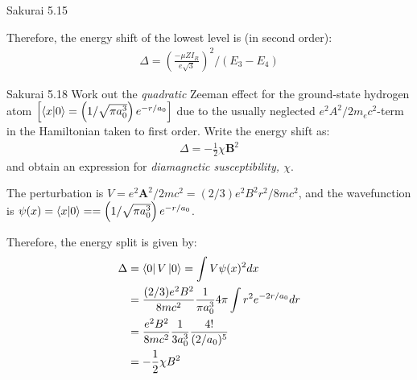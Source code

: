 \documentclass{article}
\newcommand{\bs}{\boldsymbol}
\begin{document}
\begin{section}{Sakurai 5.15}
\begin{tcolorbox}[breakable]
			Therefore, the energy shift of the lowest level is (in second order):
			\begin{align*}
				\Delta = \left( \frac{-\mu Z I_R}{e\sqrt{3}} \right)^2 / (E_3 - E_4)
			\end{align*}
		 	
		\end{tcolorbox}
	\end{section}

	\newpage
	\begin{section}{Sakurai 5.18}
		Work out the {\it quadratic} Zeeman effect for the ground-state hydrogen atom $\left[\bra{x}\ket{0} = \left( 1/\sqrt{\pi a_0^3}\right) e^{-r/a_0} \right]$ due to the usually neglected $e^2 A^2/2m_ec^2$-term in the Hamiltonian taken to first order. Write the energy shift as:
		\begin{align*}
			\Delta = -\frac{1}{2}\chi\bs{B}^2
		\end{align*}
		and obtain an expression for {\it diamagnetic susceptibility, $\chi$}.
		
		\begin{tcolorbox}[breakable]
			The perturbation is $V = e^2 \bs{A}^2/2mc^2 = (2/3)e^2B^2r^2/8mc^2$, and the wavefunction is $\psi(x) = \bra{x}\ket{0} = = \left( 1/\sqrt{\pi a_0^3}\right) e^{-r/a_0}$.

			Therefore, the energy split is given by:
			\begin{align*}
				\Delta &= \bra{0}V\ket{0} = \int V \psi(x)^2 dx \\
				&= \frac{(2/3)e^2B^2}{8mc^2} \frac{1}{\pi a_0^3} 4\pi \int r^2 e^{-2r/a_0} dr \\
				&= \frac{e^2B^2}{8mc^2} \frac{1}{3 a_0^3} \frac{4!}{(2/a_0)^5} \\
				&= -\frac{1}{2} \chi B^2
			\end{align*}
		\end{tcolorbox}
	\end{section}
\end{document}
